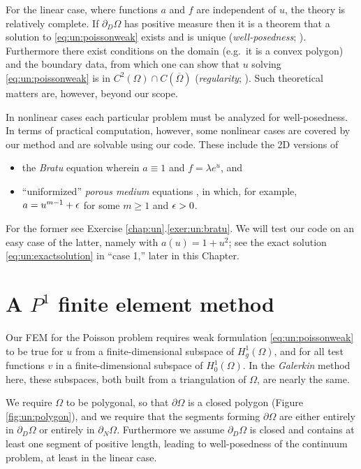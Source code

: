 For the linear case, where functions $a$ and $f$ are independent of $u$, the theory is relatively complete.  If $\partial_D \Omega$ has positive measure then it is a theorem that a solution to \eqref{eq:un:poissonweak} exists and is unique (\emph{well-posedness}; \citep{Ciarlet2002,Evans2010}).  Furthermore there exist conditions on the domain (e.g.~it is a convex polygon) and the boundary data, from which one can show that $u$ solving \eqref{eq:un:poissonweak} is in $C^2(\Omega) \cap C(\overline \Omega)$ (\emph{regularity}; \citep{Evans2010}).  Such theoretical matters are, however, beyond our scope.

In nonlinear cases each particular problem must be analyzed for well-posedness.  In terms of practical computation, however, some nonlinear cases are covered by our method and are solvable using our code.  These include the 2D versions of
\begin{itemize}
\item the \emph{Bratu} equation wherein $a\equiv 1$ and $f=\lambda e^u$, and
\item ``uniformized'' \emph{porous medium} equations \citep{Ockendonetal2003}, in which, for example, $a=u^{m-1}+\epsilon$ for some $m\ge 1$ and $\epsilon>0$.
\end{itemize}
For the former see Exercise \ref{chap:un}.\ref{exer:un:bratu}.  We will test our code on an easy case of the latter, namely with $a(u)=1+u^2$; see the exact solution \eqref{eq:un:exactsolution} in ``case 1,'' later in this Chapter.


\section{A $P^1$ finite element method}

Our FEM for the Poisson problem requires weak formulation \eqref{eq:un:poissonweak} to be true for $u$ from a finite-dimensional subspace of $H_{g}^1(\Omega)$, and for all test functions $v$ in a finite-dimensional subspace of $H_{0}^1(\Omega)$.  In the \emph{Galerkin} method here, these subspaces, both built from a triangulation of $\Omega$, are nearly the same.

We require $\Omega$ to be polygonal, so that $\partial\Omega$ is a closed polygon (Figure \ref{fig:un:polygon}), and we require that the segments forming $\partial\Omega$ are either entirely in $\partial_D\Omega$ or entirely in $\partial_N\Omega$.  Furthermore we assume $\partial_D\Omega$ is closed and contains at least one segment of positive length, leading to well-posedness of the continuum problem, at least in the linear case.

